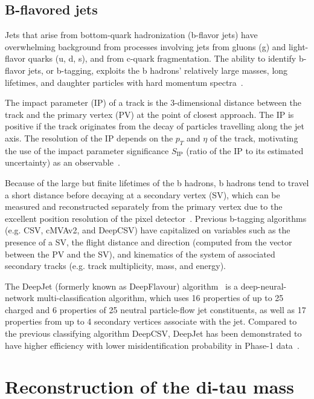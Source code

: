\subsection{B-flavored jets}
\label{section:b-flavour-jets}
Jets that arise from bottom-quark hadronization (b-flavor jets) have overwhelming background from processes involving jets from gluons (g) and light-flavor quarks (u, d, s), and from c-quark fragmentation. The ability to identify b-flavor jets, or b-tagging, exploits the b hadrons' relatively large masses, long lifetimes, and daughter particles with hard momentum spectra~\cite{CMS-BTV-12-001}. 

The impact parameter (IP) of a track is the 3-dimensional distance between the track and the primary vertex (PV) at the point of closest approach. The IP is positive if the track originates from the decay of particles travelling along the jet axis. The resolution of the IP depends on the $p_{T}$ and $\eta$ of the track, motivating the use of the impact parameter significance $S_{\text{IP}}$ (ratio of the IP to its estimated uncertainty) as an observable~\cite{CMS-BTV-12-001}.

Because of the large but finite lifetimes of the b hadrons, b hadrons tend to travel a short distance before decaying at a secondary vertex (SV), which can be measured and reconstructed separately from the primary vertex due to the excellent position resolution of the pixel detector~\cite{CMS-BTV-12-001}. Previous b-tagging algorithms (e.g. CSV, cMVAv2, and DeepCSV) have capitalized on variables such as the presence of a SV, the flight distance and direction (computed from the vector between the PV and the SV), and kinematics of the system of associated secondary tracks (e.g. track multiplicity, mass, and energy). 

The DeepJet (formerly known as DeepFlavour) algorithm~\cite{CMS-DP-2017-013} is a deep-neural-network multi-classification algorithm, which uses 16 properties of up to 25 charged and 6 properties of 25 neutral particle-flow jet constituents, as well as 17 properties from up to 4 secondary vertices associate with the jet. Compared to the previous classifying algorithm DeepCSV, DeepJet has been demonstrated to have higher efficiency with lower misidentification probability in Phase-1 data~\cite{CMS-DP-2018-058}. 



\section{Reconstruction of the di-tau mass}
\label{section:svfit}

